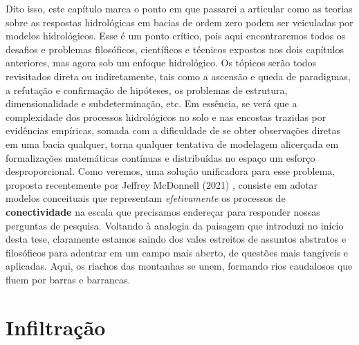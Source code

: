 \documentclass[./main.tex]{subfiles}
\begin{document}
\par Dito isso, este capítulo marca o ponto em que passarei a articular como as teorias sobre as respostas hidrológicas em bacias de ordem zero podem ser veiculadas por modelos hidrológicos. Esse é um ponto crítico, pois aqui encontraremos todos os desafios e problemas filosóficos, científicos e técnicos expostos nos dois capítulos anteriores, mas agora sob um enfoque hidrológico. Os tópicos serão todos revisitados direta ou indiretamente, tais como a ascensão e queda de paradigmas, a refutação e confirmação de hipóteses, os problemas de estrutura, dimensionalidade e subdeterminação, etc. Em essência, se verá que a complexidade dos processos hidrológicos no solo e nas encostas trazidas por evidências empíricas, somada com a dificuldade de se obter observações diretas em uma bacia qualquer, torna qualquer tentativa de modelagem alicerçada em formalizações matemáticas contínuas e distribuídas no espaço um esforço desproporcional. Como veremos, uma solução unificadora para esse problema, proposta recentemente por Jeffrey McDonnell (2021) \cite{mcdonnell2021}, consiste em adotar modelos conceituais que representam \textit{efetivamente} os processos de \textbf{conectividade} na escala que precisamos endereçar para responder nossas perguntas de pesquisa. Voltando à analogia da paisagem que introduzi no início desta tese, claramente estamos saindo dos vales estreitos de assuntos abstratos e filosóficos para adentrar em um campo mais aberto, de questões mais tangíveis e aplicadas. Aqui, os riachos das montanhas se unem, formando rios caudalosos que fluem por barras e barrancas.

\section{Infiltração} \label{sec:hydro:mechs}

\end{document}
